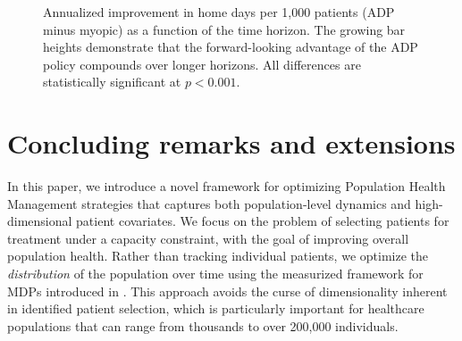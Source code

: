 \documentclass[12pt,a4paper]{article}
\begin{document}
\begin{figure}[ht]
\centering
{}
\caption{Annualized improvement in home days per 1,000 patients (ADP minus myopic) as a function of the time horizon. The growing bar heights demonstrate that the forward-looking advantage of the ADP policy compounds over longer horizons. All differences are statistically significant at $p < 0.001$.\label{fig:annual_gain}}
\end{figure}




		\section{Concluding remarks and extensions}


In this paper, we introduce a novel framework for optimizing Population Health Management strategies that captures both population-level dynamics and high-dimensional patient covariates. We focus on the problem of selecting patients for treatment under a capacity constraint, with the goal of improving overall population health. Rather than tracking individual patients, we optimize the {\it distribution} of the population over time using the measurized framework for MDPs introduced in \cite{measurized}. This approach avoids the curse of dimensionality inherent in identified patient selection, which is particularly important for healthcare populations that can range from thousands to over 200,000 individuals.%
\end{document}
